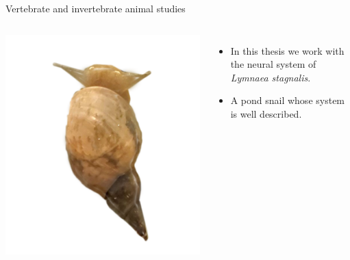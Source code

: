 \documentclass[aspectratio=43]{beamer}
\begin{document}
\begin{frame}{Vertebrate and invertebrate animal studies}

		\begin{columns}[t]
			\includegraphics[width=\linewidth]{intro/lymnaea.png}
			
			\vspace{-4cm} %
			\raggedleft
			\begin{itemize}
				\item<1->In this thesis we work with the neural system of \textit{Lymnaea stagnalis}.
				\item<2>A pond snail whose system is well described.
			\end{itemize}
		\end{columns}
	
\end{frame}
\end{document}
